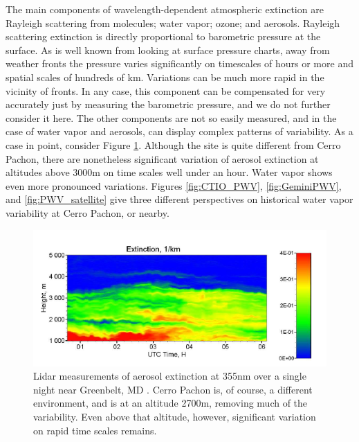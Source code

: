 \documentclass[12pt,preprint]{aastex}
\begin{document}
The main components of wavelength-dependent atmospheric extinction are Rayleigh scattering from molecules; water vapor; ozone; and aerosols.   Rayleigh scattering extinction is directly proportional to barometric pressure at the surface.  As is well known from looking at surface pressure charts, away from weather fronts the pressure varies significantly on timescales of hours or more and spatial scales of hundreds of km.  Variations can be much more rapid in the vicinity of fronts.   In any case, this component can be compensated for very accurately just by measuring the barometric pressure, and we do not further consider it here.  The other components are not so easily measured, and in the case of water vapor and aerosols, can display complex patterns of variability.   As a case in point, consider Figure \ref{fig:AerosolVar}.  Although the site is quite different from Cerro Pachon, there are nonetheless significant variation of aerosol extinction at altitudes above 3000m on time scales well under an hour.  Water vapor shows even more pronounced variations.  Figures \ref{fig:CTIO_PWV}, \ref{fig:GeminiPWV}, and \ref{fig:PWV_satellite} give three different perspectives on historical water vapor variability at Cerro Pachon, or nearby.   

\begin{figure}[htbp]
\includegraphics[width=6in]{AtmoFigs/AerosolVar}
\caption{ {Lidar measurements of aerosol extinction at 355nm over a single night
near Greenbelt, MD \citep{Veselovskii2013}.  Cerro Pachon is, of
course, a different environment, and is at an altitude 2700m, removing
much of the variability.  Even above that altitude, however,
significant variation on rapid time scales remains.}
\label{fig:AerosolVar} }
\end{figure}
\end{document}

